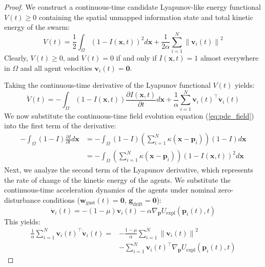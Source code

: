 \documentclass[letterpaper, 10pt, conference]{IEEEtran}
\newcommand{\norm}[1]{\left\lVert#1\right\rVert}
\begin{document}
\begin{proof}
We construct a continuous-time candidate Lyapunov-like energy functional $V(t) \geq 0$ containing the spatial unmapped information state and total kinetic energy of the swarm:
\begin{equation}
    V(t) = \frac{1}{2} \int_{\Omega} (1 - I(\mathbf{x}, t))^2 d\mathbf{x} + \frac{1}{2\alpha} \sum_{i=1}^N \norm{\mathbf{v}_i(t)}^2
\end{equation}
Clearly, $V(t) \geq 0$, and $V(t) = 0$ if and only if $I(\mathbf{x}, t) = 1$ almost everywhere in $\Omega$ and all agent velocities $\mathbf{v}_i(t) = \mathbf{0}$.

Taking the continuous-time derivative of the Lyapunov functional $V(t)$ yields:
\begin{equation}
    \dot{V}(t) = -\int_{\Omega} (1 - I(\mathbf{x}, t)) \frac{\partial I(\mathbf{x}, t)}{\partial t} d\mathbf{x} + \frac{1}{\alpha} \sum_{i=1}^N \mathbf{v}_i(t)^\top \dot{\mathbf{v}}_i(t)
\end{equation}
We now substitute the continuous-time field evolution equation (\ref{eq:pde_field}) into the first term of the derivative:
\begin{align}
    -\int_{\Omega} (1 - I) \frac{\partial I}{\partial t} d\mathbf{x} &= -\int_{\Omega} (1 - I) \left( \sum_{i=1}^N \kappa(\mathbf{x} - \mathbf{p}_i) \right) (1 - I) d\mathbf{x} \nonumber \\
    &= -\int_{\Omega} \left( \sum_{i=1}^N \kappa(\mathbf{x} - \mathbf{p}_i) \right) (1 - I(\mathbf{x}, t))^2 d\mathbf{x}
\end{align}
Next, we analyze the second term of the Lyapunov derivative, which represents the rate of change of the kinetic energy of the agents. We substitute the continuous-time acceleration dynamics of the agents under nominal zero-disturbance conditions ($\mathbf{w}_{\text{gust}}(t) = \mathbf{0}$, $\mathbf{g}_{\text{drift}} = \mathbf{0}$):
\begin{equation}
    \dot{\mathbf{v}}_i(t) = -(1 - \mu) \mathbf{v}_i(t) - \alpha \nabla_{\mathbf{p}} U_{\text{expl}}(\mathbf{p}_i(t), t)
\end{equation}
This yields:
\begin{align}
    \frac{1}{\alpha} \sum_{i=1}^N \mathbf{v}_i(t)^\top \dot{\mathbf{v}}_i(t) = &-\frac{1-\mu}{\alpha} \sum_{i=1}^N \norm{\mathbf{v}_i(t)}^2 \nonumber \\
    &- \sum_{i=1}^N \mathbf{v}_i(t)^\top \nabla_{\mathbf{p}} U_{\text{expl}}(\mathbf{p}_i(t), t)
\end{align}

\end{proof}
\end{document}
